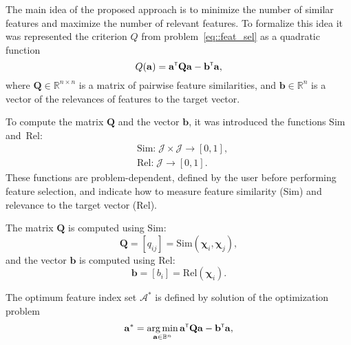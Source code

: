 \documentclass[a4paper,12pt]{article}
\theoremstyle{plain} %
\theoremstyle{definition} %
\theoremstyle{remark} %
\newcommand{\cA}{\mathcal{A}}
\newcommand{\T}{{\text{\tiny\sffamily\upshape\mdseries T}}}
\newcommand{\argmin}{\mathop{\arg \min}\limits}
\begin{document}
	The main idea of the proposed approach is to minimize the number of similar features and maximize the number of relevant features. 
	To formalize this idea it was represented the criterion $Q$ from problem~\eqref{eq::feat_sel} as a quadratic function
	\begin{equation}
	Q(\mathbf{a}) = \mathbf{a}^{\T}\mathbf{Q} \mathbf{a} - \mathbf{b}^{\T} \mathbf{a},
	\label{eq::quad_form}
	\end{equation}
	where $\mathbf{Q} \in \mathbb{R}^{n \times n}$ is a matrix of pairwise feature similarities, and $\mathbf{b} \in \mathbb{R}^n$ is a vector of the relevances of features to the target vector. 
	
	To compute the matrix $\mathbf{Q}$ and the vector $\mathbf{b}$, it was introduced the functions Sim and~Rel:
	\begin{equation}
	\begin{split}
	&\text{Sim:} \; \mathcal{J} \times \mathcal{J} \rightarrow [0, 1],\\
	&\text{Rel:} \; \mathcal{J} \rightarrow [0, 1].
	\end{split}
	\end{equation}
	These functions are problem-dependent, defined by the user before performing feature selection, and indicate how to measure feature similarity (Sim) and relevance to the target vector (Rel).

	The matrix $\mathbf{Q}$ is computed using Sim:
	\begin{equation}
	\mathbf{Q} = [q_{ij}] = 
	\text{Sim}\left(\boldsymbol{\chi}_i, \boldsymbol{\chi}_j\right),
	\label{eq::sim}
	\end{equation}
	and the vector $\mathbf{b}$ is computed using Rel:
	\begin{equation}
	\mathbf{b} = [b_i] = \text{Rel}\left(\boldsymbol{\chi}_i \right).
	\label{eq::rel}
	\end{equation}
	
	The optimum feature index set $\cA^*$ is defined by solution of the optimization problem
	\begin{equation}
	\mathbf{a}^* = \argmin_{\mathbf{a} \in \mathbb{B}^n} \mathbf{a}^{\T}\mathbf{Q} \mathbf{a} - \mathbf{b}^{\T}\mathbf{a},
	\label{eq::feat_sel_quad}
	\end{equation}
	
\end{document}

